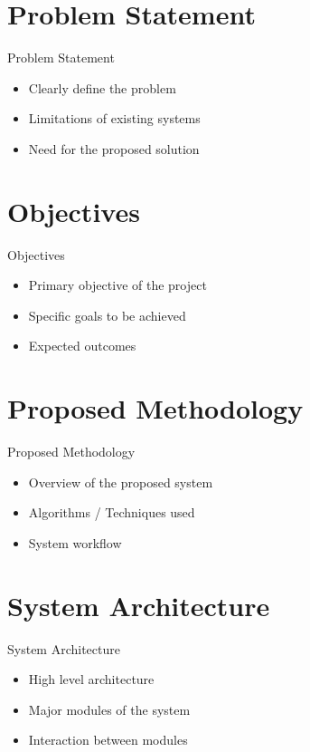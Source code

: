\documentclass{beamer}
\begin{document}
\section{Problem Statement}

\begin{frame}{Problem Statement}
\begin{itemize}
\item Clearly define the problem
\item Limitations of existing systems
\item Need for the proposed solution
\end{itemize}
\end{frame}

\section{Objectives}

\begin{frame}{Objectives}
\begin{itemize}
\item Primary objective of the project
\item Specific goals to be achieved
\item Expected outcomes
\end{itemize}
\end{frame}

\section{Proposed Methodology}

\begin{frame}{Proposed Methodology}
\begin{itemize}
\item Overview of the proposed system
\item Algorithms / Techniques used
\item System workflow
\end{itemize}
\end{frame}

\section{System Architecture}

\begin{frame}{System Architecture}
\begin{itemize}
\item High level architecture
\item Major modules of the system
\item Interaction between modules
\end{itemize}
\end{frame}
\end{document}
